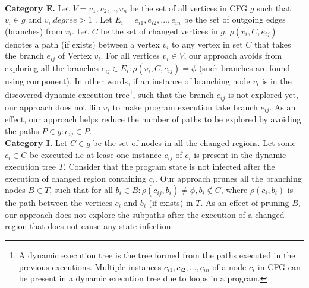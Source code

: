 \\ \textbf{Category E. }Let $V={v_1,v_2,..,v_n}$ be the set of all vertices in CFG $g$ such that $ v_i \in g$ and $v_i.degree >1$ . Let $E_i = {e_{i1}, e_{i2},...,e_{in}}$ be the set of outgoing edges (branches) from $v_i$. Let $C$ be the set of changed vertices in $g$, $\rho(v_i, C, e_{ij})$ denotes a path (if exists) between a vertex $v_i$ to any vertex in set $C$ that takes the branch $e_{ij}$ of Vertex $v_i$.
For all vertices $v_i \in V$, our approach avoids from exploring all the branches $e_{ij}\in E_i : \rho(v_i, C, e_{ij}) = \phi$ (such branches are found using  component). In other words, if an instance of branching node $v_i$ is in the discovered dynamic execution tree\footnote{\scriptsize{A dynamic execution tree is the tree formed from the paths executed in the previous executions. Multiple instances $c_{i1}, c_{i2}, ..., c_{in}$ of a node $c_i$ in CFG can be present in a dynamic execution tree due to loops in a program.}}, such that the branch $e_{ij}$ is not explored yet, our approach does not flip $v_i$ to make program execution take branch $e_{ij}$.
As an effect, our approach helps reduce the number of paths to be explored by avoiding the paths $P \in g : e_{ij} \in P$.
\\
\textbf{Category I. }
Let $C \in g$ be the set of nodes in all the changed regions.
Let some $c_i \in C$ be executed i.e  at lease one instance $c_{ij}$ of $c_i$ is present in the dynamic execution tree $T$. Consider that the program state is not infected after the execution of changed region containing $c_i$. Our approach prunes all the branching nodes $B \in T$, such that for all $b_i \in B: \rho(c_{ij}, b_i) \neq \phi, b_i \notin C $, where $\rho(c_i, b_i)$ is the path between the vertices $c_i$ and $b_i$ (if exists) in $T$. As an effect of pruning $B$, our approach does not explore the subpaths after the execution of a changed region that does not cause any state infection.
